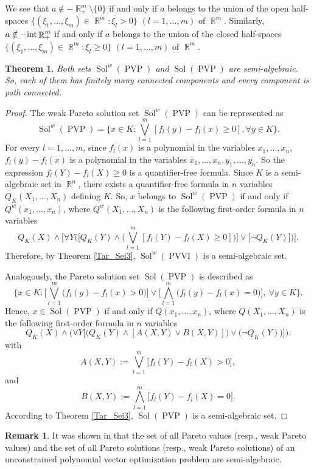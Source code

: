 \documentclass[]{interact}
\theoremstyle{plain}%
\newtheorem{theorem}{Theorem}[section]
\theoremstyle{definition}
\newtheorem{remark}{Remark}[section]
\DeclareMathOperator{\Sol}{Sol}
\DeclareMathOperator{\PVVI}{PVVI}
\DeclareMathOperator{\PVP}{PVP}
\DeclareMathOperator{\R}{\mathbb{R}}
\begin{document}
We see that $a\notin -\R^m_+\setminus\{0\}$ if and only if $a$ belongs to the union of the open half-spaces $\big\{(\xi_1,...,\xi_m)\in\R^m:\xi_l>0\big\}$ $(l=1,...,m)$ of $\R^m$. Similarly, $a\notin -{\rm int}\R^m_+$ if and only if $a$ belongs to the union of the closed half-spaces $\big\{(\xi_1,...,\xi_m)\in\R^m:\xi_l\geq 0\big\}$ $ (l=1,...,m)$ of $\R^m$.

\begin{theorem}%
	Both sets $\Sol^w(\PVP)$ and $\Sol(\PVP)$  are semi-algebraic. So, each of them has finitely many connected components and every component is path connected.
\end{theorem}
\begin{proof} The weak Pareto solution set $\Sol^w(\PVP)$ can be represented as 
	$$\Sol^w(\PVP)=\Big\lbrace x\in K: \bigvee_{l=1}^{m}[f_l(y)-f_l(x)\geq 0],\forall y\in K\Big\rbrace.$$
	For every $l=1,\dots,m$, since $f_l(x)$ is a polynomial in the variables $x_1,...,x_n$, $f_l(y)-f_l(x)$ is a polynomial in the variables $x_1,...,x_n,y_1,...,y_n$. So the expression $f_l(Y)-f_l(X)\geq 0$ is a quantifier-free formula.  Since $K$ is a semi-algebraic set in $\R^n$, there exists a quantifier-free formula in $n$ variables $Q_K(X_1,...,X_n)$ defining $K.$ So, $x$ belongs to $\Sol^w(\PVP)$ if and only if $Q^w(x_1,...,x_n)$, where $Q^w(X_1,...,X_n)$ is the following first-order formula in $n$ variables
	$$Q_K(X) \wedge\Big[  \forall Y \Big( \Big[  Q_K(Y) \wedge\Big(\bigvee_{l=1}^{m} [f_l(Y)-f_l(X)\geq 0]\Big)\Big]\vee \big[ \neg Q_K(Y)\big]  \Big) \Big]  .$$
	Therefore, by Theorem \ref{Tar_Sei3}, $\Sol^w(\PVVI)$ is a semi-algebraic set.
	
	Analogously, the Pareto solution set  $\Sol(\PVP)$ is described as
	$$\Big\lbrace x\in K: \Big[ \bigvee_{l=1}^{m} \big(f_l(y)-f_l(x)>0\big)\Big] \vee \Big[ \bigwedge_{l=1}^{m} \big(f_l(y)-f_l(x)= 0\big)\Big],\ \forall y\in K\Big\rbrace.$$
	Hence, $x\in \Sol(\PVP)$ if and only if $Q(x_1,...,x_n)$, where $Q(X_1,...,X_n)$ is the following first-order formula in $n$ variables
	$$Q_K(X)  \wedge \Big(  \forall Y \Big[\Big( Q_K(Y) \wedge \left[ A(X,Y) \vee B(X,Y)\right]\Big)\vee \Big( \neg Q_K(Y)\Big) \Big] \Big) .$$
	with $$A(X,Y):=\bigvee_{l=1}^{m} \big[ f_l(Y)-f_l(X)>0\big],$$ and $$B(X,Y):= \bigwedge_{l=1}^{m} \big[ f_l(Y)-f_l(X)=0\big].$$
	According to Theorem \ref{Tar_Sei3}, $\Sol(\PVP)$ is a semi-algebraic set.
\end{proof}

\begin{remark}
	It was shown in \cite[Remark 3.2]{KimPhamTuyen2016} that the set of all Pareto values (resp., weak Pareto values) and the set of all Pareto solutions (resp., weak Pareto solutions)  of  an unconstrained polynomial vector optimization problem are semi-algebraic. 
\end{remark}
\end{document}
